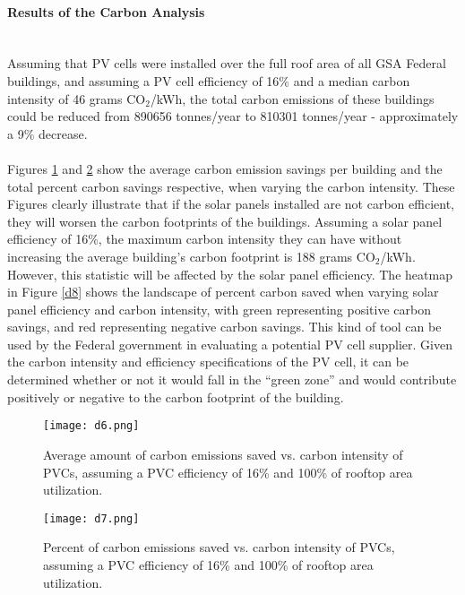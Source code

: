 \documentclass[10pt]{book} %
\begin{document}
\paragraph{Results of the Carbon Analysis} \mbox{ }\\
Assuming that PV cells were installed over the full roof area of all GSA Federal buildings, and assuming a PV cell efficiency of 16\% and a median carbon intensity of 46 grams CO$_{2}$/kWh, the total carbon emissions of these buildings could be reduced from 890656 tonnes/year to 810301 tonnes/year - approximately a 9\% decrease.
\\\\
\noindent Figures \ref{d6} and \ref{d7} show the average carbon emission savings per building and the total percent carbon savings respective, when varying the carbon intensity. These Figures clearly illustrate that if the solar panels installed are not carbon efficient, they will worsen the carbon footprints of the buildings. Assuming a solar panel efficiency of 16\%, the maximum carbon intensity they can have without increasing the average building's carbon footprint is 188 grams CO$_{2}$/kWh. However, this statistic will be affected by the solar panel efficiency. The heatmap in Figure \ref{d8} shows the landscape of percent carbon saved when varying solar panel efficiency and carbon intensity, with green representing positive carbon savings, and red representing negative carbon savings. This kind of tool can be used by the Federal government in evaluating a potential PV cell supplier. Given the carbon intensity and efficiency specifications of the PV cell, it can be determined whether or not it would fall in the ``green zone'' and would contribute positively or negative to the carbon footprint of the building.

\begin{figure}
\begin{center}
\texttt{[image: d6.png]}
\caption{Average amount of carbon emissions saved vs. carbon intensity of PVCs, assuming a PVC efficiency of 16\% and 100\% of rooftop area utilization.}
\label{d6}
\end{center}
\end{figure}


\begin{figure}
\begin{center}
\texttt{[image: d7.png]}
\caption{Percent of carbon emissions saved vs. carbon intensity of PVCs, assuming a PVC efficiency of 16\% and 100\% of rooftop area utilization.}
\label{d7}
\end{center}
\end{figure}
\end{document}
